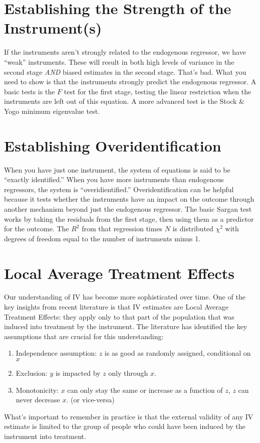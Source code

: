 \documentclass[12 pt]{article}
\begin{document}
\section{Establishing the Strength of the Instrument(s)}
\label{sec:establ-strength-inst}

If the instruments aren't strongly related to the endogenous
regressor, we have ``weak'' instruments. These will result in both
high levels of variance in the second stage \textit{AND} biased
estimates in the second stage. That's bad. What you need to show is
that the instruments strongly predict the endogenous regressor. A
basic tests is the $F$ test for the first stage, testing the linear
restriction when the instruments are left out of this equation. A
more advanced test is the Stock \& Yogo minimum eigenvalue test. 

\section{Establishing Overidentification}
\label{sec:establ-over}

When you have just one instrument, the system of equations is said to
be ``exactly identified.'' When you have more instruments than
endogenous regressors, the system is ``overidientified.''
Overidentification can be helpful because it tests whether the
instruments have an impact on the outcome through another mechanism
beyond just the endogenous regressor. The basic Sargan test works by
taking the residuals from the first stage, then using them as a
predictor for the outcome. The $R^2$ from that regression times $N$ is
distributed $\chi^2$ with degrees of freedom equal to the number of
instruments minus 1.

 

\section{Local Average Treatment Effects}
\label{sec:local-aver-treatm}

Our understanding of IV has become more sophisticated over time. One
of the key insights from recent literature is that IV estimates are
Local Average Treatment Effects: they apply only to that part of the
population that was induced into treatment by the instrument. The
literature has identified the key assumptions that are crucial for this
understanding:

\begin{enumerate}
\item Independence assumption: $z$ is as good as randomly assigned,
  conditional on $x$
\item Exclusion: $y$ is impacted by $z$ only through $x$.
\item Monotonicity: $x$ can only stay the same or increase as a
  function of $z$, $z$ can never decrease $x$. (or vice-versa)
\end{enumerate}

What's important to remember in practice is that the external validity
of any IV estimate is limited to the group of people who could have
been induced by the instrument into treatment. 
\end{document}
